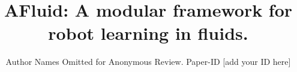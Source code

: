\documentclass[conference]{IEEEtran}
\begin{document}
\title{AFluid: A modular framework for robot learning in fluids.}

\author{Author Names Omitted for Anonymous Review. Paper-ID [add your ID here]}





% 


\maketitle

%
\IEEEpeerreviewmaketitle


%
%
%
%



\end{document}
